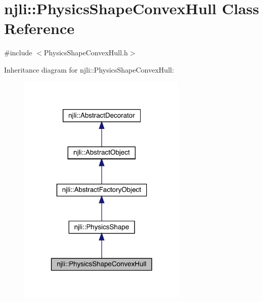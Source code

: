 \hypertarget{classnjli_1_1_physics_shape_convex_hull}{}\section{njli\+:\+:Physics\+Shape\+Convex\+Hull Class Reference}
\label{classnjli_1_1_physics_shape_convex_hull}


{\ttfamily \#include $<$Physics\+Shape\+Convex\+Hull.\+h$>$}



Inheritance diagram for njli\+:\+:Physics\+Shape\+Convex\+Hull\+:\nopagebreak
\begin{figure}[H]
\begin{center}
\leavevmode
\includegraphics[width=228pt]{classnjli_1_1_physics_shape_convex_hull__inherit__graph}
\end{center}
\end{figure}


